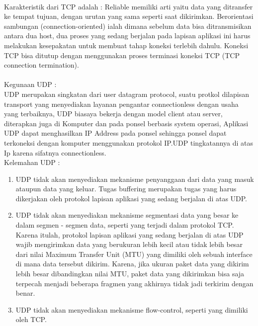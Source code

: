 \documentclass[12pt,a4paper]{article}
\begin{document}
\paragraph{}
\hspace{1cm}
Karakteristik dari TCP adalah :
Reliable memiliki arti yaitu data yang ditransfer ke tempat tujuan,  dengan urutan yang sama seperti saat dikirimkan.
Berorientasi sambungan (connection-oriented) ialah dimana sebelum data bisa ditransmisikan antara dua host, dua proses yang sedang berjalan pada lapisan aplikasi ini harus melakukan kesepakatan untuk membuat tahap koneksi terlebih dahulu. Koneksi TCP bisa ditutup dengan menggunakan proses terminasi koneksi TCP (TCP connection termination).

\paragraph{}
\hspace{1cm}
Kegunaan UDP : \\
UDP merupakan singkatan dari user datagram protocol, suatu protkol dilapisan transport yang menyediakan  layanan pengantar connectionless dengan usaha yang terbaiknya, UDP biasaya bekerja dengan model client atau server, diterapkan juga di Komputer dan pada ponsel berbasis system operasi, Aplikasi UDP dapat menghasilkan IP Address pada ponsel sehingga ponsel dapat terkoneksi dengan komputer menggunakan protokol IP.UDP tingkatannya di atas Ip karena sifatnya connectionless.\\

Kelemahan UDP :
\begin{enumerate}
\item UDP tidak akan menyediakan mekanisme penyanggaan dari data yang masuk ataupun data yang keluar. Tugas buffering merupakan tugas yang harus dikerjakan oleh protokol lapisan aplikasi yang sedang berjalan di atas UDP.
\item UDP tidak akan menyediakan mekanisme segmentasi data yang besar ke dalam segmen - segmen data, seperti yang terjadi dalam protokol TCP. Karena itulah, protokol lapisan aplikasi yang sedang berjalan di atas UDP wajib mengirimkan data yang berukuran lebih kecil atau tidak lebih besar dari nilai Maximum Transfer Unit (MTU) yang dimiliki oleh sebuah interface di mana data tersebut dikirim. Karena, jika ukuran paket data yang dikirim lebih besar dibandingkan nilai MTU, paket data yang dikirimkan bisa saja terpecah menjadi beberapa fragmen yang akhirnya tidak jadi terkirim dengan benar.
\item UDP tidak akan menyediakan mekanisme flow-control, seperti yang dimiliki oleh TCP.
\end{enumerate}
\end{document}

